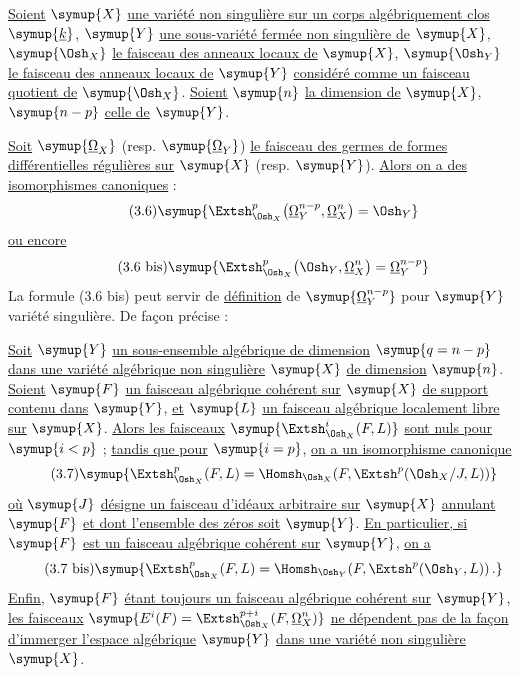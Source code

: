  \uline{Soient} $\symup{X}$ \uline{une variété non singulière sur un corps
algébriquement clos} $\symup{\underline{k}}$, $\symup{Y}$ \uline{une sous-variété fermée non singulière de} $\symup{X}$,
$\symup{\Osh_X}$ \uline{le faisceau des anneaux locaux de} $\symup{X}$, $\symup{\Osh_Y}$ \uline{le faisceau des anneaux
locaux de} $\symup{Y}$ \uline{considéré comme un faisceau quotient de} $\symup{\Osh_X}$. \uline{Soient} $\symup{n}$ \uline{la
dimension de} $\symup{X}$, $\symup{n-p}$ \uline{celle de} $\symup{Y}$.

\uline{Soit} $\symup{\underline{\Omega}_X}$ (resp. $\symup{\underline{\Omega}_Y}$) \uline{le faisceau des germes de formes
différentielles régulières sur} $\symup{X}$ (resp. $\symup{Y}$). \uline{Alors on a des isomorphismes
canoniques} :
\begin{equation}\tag{3.6}
  \symup{\Extsh_{\Osh_X}^{p}\bigl(\underline{\Omega}_Y^{n-p},\underline{\Omega}_X^{n}\bigr)=\Osh_Y}
\end{equation}
\uline{ou encore}
\begin{equation}\tag{3.6 bis}
  \symup{\Extsh_{\Osh_X}^{p}\bigl(\Osh_Y,\underline{\Omega}_X^{n}\bigr)=\underline{\Omega}_Y^{n-p}}
\end{equation}
La formule (3.6 bis) peut servir de \uline{définition} de $\symup{\underline{\Omega}_Y^{n-p}}$ pour $\symup{Y}$
variété singulière. De façon précise :

 \uline{Soit} $\symup{Y}$ \uline{un sous-ensemble algébrique de dimension}
$\symup{q=n-p}$ \uline{dans une variété algébrique non singulière} $\symup{X}$ \uline{de dimension} $\symup{n}$. \uline{Soient}
$\symup{F}$ \uline{un faisceau algébrique cohérent sur} $\symup{X}$ \uline{de support contenu dans} $\symup{Y}$, \uline{et} $\symup{L}$
\uline{un faisceau algébrique localement libre sur} $\symup{X}$. \uline{Alors les faisceaux}
$\symup{\Extsh_{\Osh_X}^{i}(F,L)}$ \uline{sont nuls pour} $\symup{i<p}$ ; \uline{tandis que pour} $\symup{i=p}$, \uline{on a un
isomorphisme canonique}
\begin{equation}\tag{3.7}
  \symup{\Extsh_{\Osh_X}^{p}(F,L)
  =\Homsh_{\Osh_X}\!\left(F,
  \Extsh^{p}(\Osh_X/J,L)\right)}
\end{equation}
\uline{où} $\symup{J}$ \uline{désigne un faisceau d'idéaux arbitraire sur} $\symup{X}$ \uline{annulant} $\symup{F}$ \uline{et dont
l'ensemble des zéros soit} $\symup{Y}$. \uline{En particulier, si} $\symup{F}$ \uline{est un faisceau algébrique
cohérent sur} $\symup{Y}$, \uline{on a}
\begin{equation}\tag{3.7 bis}
  \symup{\Extsh_{\Osh_X}^{p}(F,L)
  =\Homsh_{\Osh_Y}\!\left(F,\Extsh^{p}(\Osh_Y,L)\right).}
\end{equation}
\uline{Enfin}, $\symup{F}$ \uline{étant toujours un faisceau algébrique cohérent sur} $\symup{Y}$, \uline{les faisceaux}
$\symup{E^{i}(F)=\Extsh_{\Osh_X}^{p+i}(F,\underline{\Omega}_X^{n})}$ \uline{ne dépendent pas de la façon d'immerger l'espace algébrique} $\symup{Y}$ \uline{dans une variété
non singulière} $\symup{X}$.

